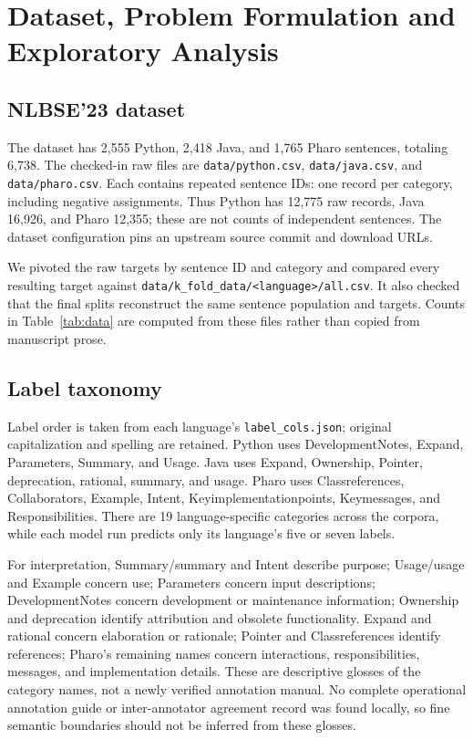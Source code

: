 \section{Dataset, Problem Formulation and Exploratory Analysis}
\subsection{NLBSE'23 dataset}
The dataset has 2,555 Python, 2,418 Java, and 1,765 Pharo sentences, totaling 6,738. The checked-in raw files are \texttt{data/python.csv}, \texttt{data/java.csv}, and \texttt{data/pharo.csv}. Each contains repeated sentence IDs: one record per category, including negative assignments. Thus Python has 12,775 raw records, Java 16,926, and Pharo 12,355; these are not counts of independent sentences. The dataset configuration pins an upstream source commit and download URLs.

We pivoted the raw targets by sentence ID and category and compared every resulting target against \texttt{data/k\_fold\_data/<language>/all.csv}. It also checked that the final splits reconstruct the same sentence population and targets. Counts in Table~\ref{tab:data} are computed from these files rather than copied from manuscript prose.


\subsection{Label taxonomy}
Label order is taken from each language's \texttt{label\_cols.json}; original capitalization and spelling are retained. Python uses DevelopmentNotes, Expand, Parameters, Summary, and Usage. Java uses Expand, Ownership, Pointer, deprecation, rational, summary, and usage. Pharo uses Classreferences, Collaborators, Example, Intent, Keyimplementationpoints, Keymessages, and Responsibilities. There are 19 language-specific categories across the corpora, while each model run predicts only its language's five or seven labels.

For interpretation, Summary/summary and Intent describe purpose; Usage/usage and Example concern use; Parameters concern input descriptions; DevelopmentNotes concern development or maintenance information; Ownership and deprecation identify attribution and obsolete functionality. Expand and rational concern elaboration or rationale; Pointer and Classreferences identify references; Pharo's remaining names concern interactions, responsibilities, messages, and implementation details. These are descriptive glosses of the category names, not a newly verified annotation manual. No complete operational annotation guide or inter-annotator agreement record was found locally, so fine semantic boundaries should not be inferred from these glosses.


